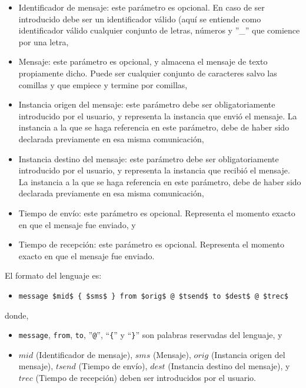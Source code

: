 \begin{itemize}
\item Identificador de mensaje: este parámetro es opcional. En caso de
  ser introducido debe ser un identificador válido (aquí se entiende
  como identificador válido cualquier conjunto de letras, números y
  ''\_'' que comience por una letra,
\item Mensaje: este parámetro es opcional, y almacena el mensaje de
  texto propiamente dicho. Puede ser cualquier conjunto de caracteres
  salvo las comillas y que empiece y termine por comillas,
\item Instancia origen del mensaje: este parámetro debe ser
  obligatoriamente introducido por el usuario, y representa la
  instancia que envió el mensaje. La instancia a la que se haga
  referencia en este parámetro, debe de haber sido declarada
  previamente en esa misma comunicación,
\item Instancia destino del mensaje: este parámetro debe ser
  obligatoriamente introducido por el usuario, y representa la
  instancia que recibió el mensaje. La instancia a la que se haga
  referencia en este parámetro, debe de haber sido declarada
  previamente en esa misma comunicación,
\item Tiempo de envío: este parámetro es opcional. Representa el
  momento exacto en que el mensaje fue enviado, y
\item Tiempo de recepción: este parámetro es opcional. Representa el
  momento exacto en que el mensaje fue enviado.
\end{itemize}

El formato del lenguaje es:

\begin{itemize}
\item \lstinline[mathescape]!message $mid$ { $sms$ } from $orig$ @ $tsend$ to $dest$ @ $trec$!
\end{itemize}

donde,
\begin{itemize}
\item \lstinline{message}, \lstinline{from}, \lstinline{to},
  ''\lstinline{@}'', ``\lstinline!{!'' y ``\lstinline!}!'' son
  palabras reservadas del lenguaje, y
\item $mid$ (Identificador de mensaje), $sms$ (Mensaje), $orig$
  (Instancia origen del mensaje), $tsend$ (Tiempo de envío), $dest$
  (Instancia destino del mensaje), y $trec$ (Tiempo de recepción)
  deben ser introducidos por el usuario.
\end{itemize}

